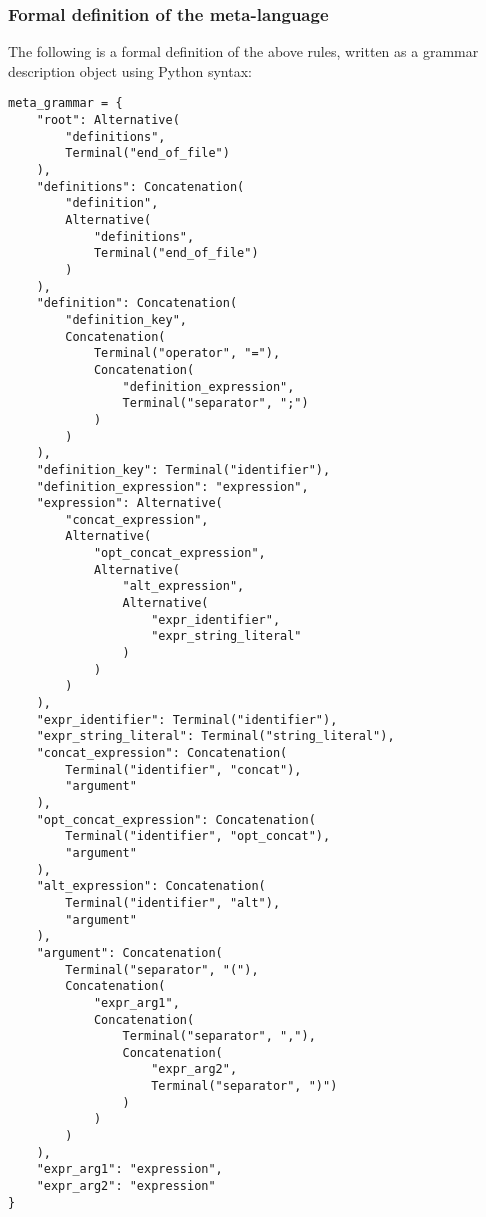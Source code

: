 \documentclass{article}
\begin{document}
	\subsubsection{Formal definition of the meta-language}

	The following is a formal definition of the above rules, written as a
	grammar description object using Python syntax:

	\scriptsize\begin{verbatim}meta_grammar = {
    "root": Alternative(
        "definitions",
        Terminal("end_of_file")
    ),
    "definitions": Concatenation(
        "definition",
        Alternative(
            "definitions",
            Terminal("end_of_file")
        )
    ),
    "definition": Concatenation(
        "definition_key",
        Concatenation(
            Terminal("operator", "="),
            Concatenation(
                "definition_expression",
                Terminal("separator", ";")
            )
        )
    ),
    "definition_key": Terminal("identifier"),
    "definition_expression": "expression",
    "expression": Alternative(
        "concat_expression",
        Alternative(
            "opt_concat_expression",
            Alternative(
                "alt_expression",
                Alternative(
                    "expr_identifier",
                    "expr_string_literal"
                )
            )
        )
    ),
    "expr_identifier": Terminal("identifier"),
    "expr_string_literal": Terminal("string_literal"),
    "concat_expression": Concatenation(
        Terminal("identifier", "concat"),
        "argument"
    ),
    "opt_concat_expression": Concatenation(
        Terminal("identifier", "opt_concat"),
        "argument"
    ),
    "alt_expression": Concatenation(
        Terminal("identifier", "alt"),
        "argument"
    ),
    "argument": Concatenation(
        Terminal("separator", "("),
        Concatenation(
            "expr_arg1",
            Concatenation(
                Terminal("separator", ","),
                Concatenation(
                    "expr_arg2",
                    Terminal("separator", ")")
                )
            )
        )
    ),
    "expr_arg1": "expression",
    "expr_arg2": "expression"
}\end{verbatim}
\end{document}
